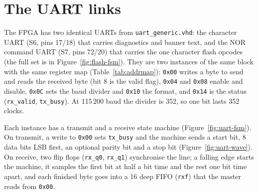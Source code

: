 \documentclass[a4paper,10pt]{article}
\begin{document}
\section{The UART links}
\label{sec:uart}

The FPGA has two identical UARTs from \texttt{uart\_generic.vhd}: the character UART (S6,
pins 17/18) that carries diagnostics and banner text, and the NOR command UART (S7, pins
72/20) that carries the one character flash opcodes (the full set is in
Figure~\ref{fig:flash-fsm}). They are two instances of the same
block with the same register map (Table~\ref{tab:addrmap}): \texttt{0x00} writes a byte to
send and reads the received byte (bit 8 is the valid flag), \texttt{0x04} and \texttt{0x08}
enable and disable, \texttt{0x0C} sets the baud divider and \texttt{0x10} the format, and
\texttt{0x14} is the status (\texttt{rx\_valid}, \texttt{tx\_busy}). At 115\,200 baud the
divider is 352, so one bit lasts 352 clocks.

Each instance has a transmit and a receive state machine (Figure~\ref{fig:uart-fsm}). On
transmit, a write to \texttt{0x00} sets \texttt{tx\_busy} and the machine sends a start
bit, 8 data bits LSB first, an optional parity bit and a stop bit
(Figure~\ref{fig:uart-wave}). On receive, two flip flops (\texttt{rx\_q0},
\texttt{rx\_q1}) synchronise the line; a falling edge starts the machine, it samples the
first bit at half a bit time and the rest one bit time apart, and each finished byte goes
into a 16 deep FIFO (\texttt{rxf}) that the master reads from \texttt{0x00}.
\end{document}
